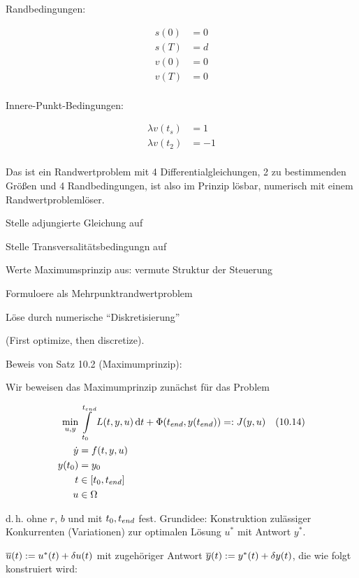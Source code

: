 Randbedingungen:

\begin{align*}
s(0) &= 0 \\
s(T) &= d \\
v(0) &= 0 \\
v(T) &= 0 \\
\end{align*}

Innere-Punkt-Bedingungen:

\begin{align*}
\lambda v(t_s) &=  1 \\
\lambda v(t_2) &= -1 \\
\end{align*}

Das ist ein Randwertproblem mit 4 Differentialgleichungen, 2 zu bestimmenden Größen und 4 Randbedingungen, ist also im Prinzip lösbar, numerisch mit einem Randwertproblemlöser.



\bitm
\item Stelle adjungierte Gleichung auf
\item Stelle Transversalitätsbedingungn auf
\item Werte Maximumsprinzip aus: vermute Struktur der Steuerung
\item Formuloere als Mehrpunktrandwertproblem
\item Löse durch numerische "`Diskretisierung"'
\eitm

(First optimize, then discretize).

Beweis von Satz 10.2 (Maximumprinzip):

Wir beweisen das Maximumprinzip zunächst für das Problem

\begin{align*}
\min_{u,y} &\int\limits_{t_0}^{t_{end}} L(t,y,u) \,\mathrm d t + \Phi({t_{end}}, y({t_{end}}))  =: J(y,u) \quad (10.14) \\
\dot y &= f(t,y,u) \\
y(t_0) &= y_0 \\
t & \in [t_0, {t_{end}}] \\
u &\in \Omega
\end{align*}

d.\,h. ohne $r$, $b$ und mit $t_0, {t_{end}}$ fest. Grundidee: Konstruktion zulässiger Konkurrenten (Variationen) zur optimalen Lösung $u^*$ mit Antwort $y^*$.

$\overline u(t) := u^*(t) + \delta u(t)$ mit zugehöriger Antwort $\overline y(t) := y^*(t) + \delta y(t)$, die wie folgt konstruiert wird:

